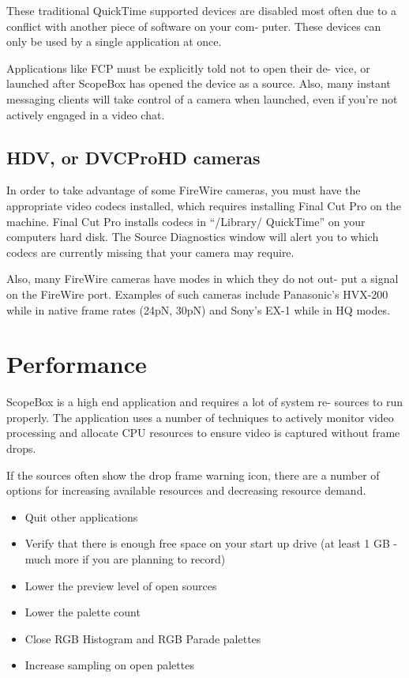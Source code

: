 \documentclass[10,letterpaper,]{report}
\begin{document}
These traditional QuickTime supported devices are disabled most often
due to a conflict with another piece of software on your com- puter.
These devices can only be used by a single application at once.

Applications like FCP must be explicitly told not to open their de-
vice, or launched after ScopeBox has opened the device as a source.
Also, many instant messaging clients will take control of a camera when
launched, even if you're not actively engaged in a video chat.

\section{HDV, or DVCProHD cameras}

In order to take advantage of some FireWire cameras, you must have the
appropriate video codecs installed, which requires installing Final Cut
Pro on the machine. Final Cut Pro installs codecs in ``/Library/
QuickTime'' on your computers hard disk. The Source Diagnostics window
will alert you to which codecs are currently missing that your camera
may require.

Also, many FireWire cameras have modes in which they do not out- put a
signal on the FireWire port. Examples of such cameras include
Panasonic's HVX-200 while in native frame rates (24pN, 30pN) and Sony's
EX-1 while in HQ modes.

\chapter{Performance}

ScopeBox is a high end application and requires a lot of system re-
sources to run properly. The application uses a number of techniques to
actively monitor video processing and allocate CPU resources to ensure
video is captured without frame drops.

If the sources often show the drop frame warning icon, there are a
number of options for increasing available resources and decreasing
resource demand.

\begin{itemize}
\itemsep1pt\parskip0pt
\item
  Quit other applications
\item
  Verify that there is enough free space on your start up drive (at
  least 1 GB - much more if you are planning to record)
\item
  Lower the preview level of open sources
\item
  Lower the palette count
\item
  Close RGB Histogram and RGB Parade palettes
\item
  Increase sampling on open palettes
\end{itemize}
\end{document}
